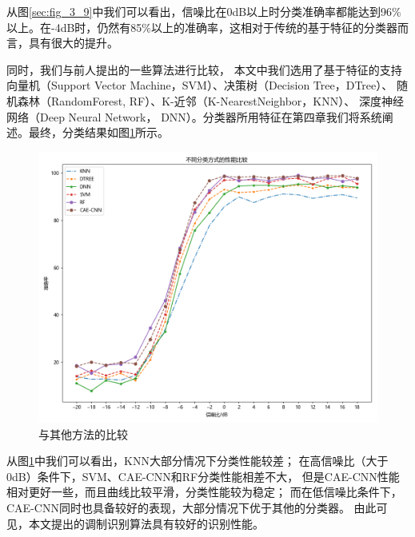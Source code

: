 从图\ref{sec:fig_3_9}中我们可以看出，信噪比在0dB以上时分类准确率都能达到96\%以上。在-4dB时，仍然有85\%以上的准确率，这相对于传统的基于特征的分类器而言，具有很大的提升。\par

同时，我们与前人提出的一些算法进行比较，
本文中我们选用了基于特征的支持向量机（Support Vector Machine，SVM）、决策树（Decision Tree，DTree）、
随机森林（RandomForest, RF）、K-近邻（K-NearestNeighbor，KNN）、
深度神经网络（Deep Neural Network， DNN）。分类器所用特征在第四章我们将系统阐述。最终，分类结果如图\ref{sec:fig_3_11}所示。\par

\begin{figure}[!h]
	\centering
	\includegraphics[scale=0.5]{figures/chapter_3/fig_3_11}
	\caption{与其他方法的比较}	\label{sec:fig_3_11}
\end{figure}

从图\ref{sec:fig_3_11}中我们可以看出，KNN大部分情况下分类性能较差；
在高信噪比（大于0dB）条件下，SVM、CAE-CNN和RF分类性能相差不大，
但是CAE-CNN性能相对更好一些，而且曲线比较平滑，分类性能较为稳定；
而在低信噪比条件下，CAE-CNN同时也具备较好的表现，大部分情况下优于其他的分类器。
由此可见，本文提出的调制识别算法具有较好的识别性能。\par

